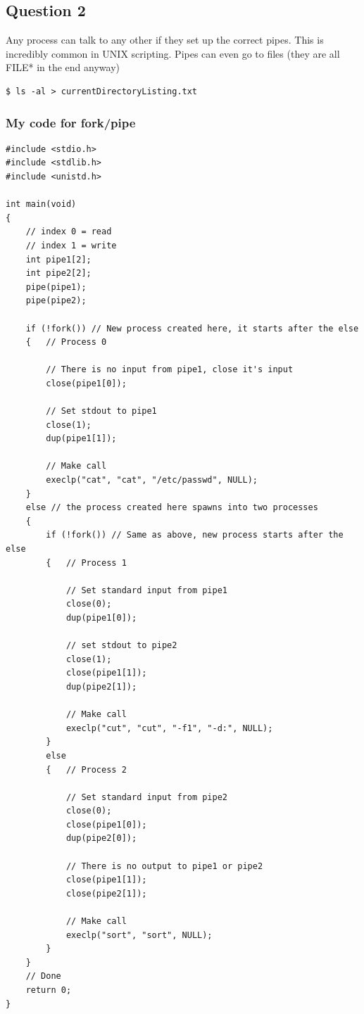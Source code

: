 \documentclass[12pt,a4paper,oneside]{article}
\begin{document}
\subsection{Question 2}
Any process can talk to any other if they set up the correct pipes.  This is incredibly common in UNIX scripting.  Pipes can even go to files (they are all FILE* in the end anyway)
\begin{verbatim}
$ ls -al > currentDirectoryListing.txt
\end{verbatim}

\subsubsection{My code for fork/pipe}
\begin{lstlisting}[basicstyle=\scriptsize, style=ElliottCListingStyle]
#include <stdio.h>
#include <stdlib.h>
#include <unistd.h>

int main(void)
{
	// index 0 = read
	// index 1 = write
	int pipe1[2];
	int pipe2[2];
	pipe(pipe1);
	pipe(pipe2);

	if (!fork()) // New process created here, it starts after the else
	{ 	// Process 0

		// There is no input from pipe1, close it's input
		close(pipe1[0]);

		// Set stdout to pipe1
		close(1);
		dup(pipe1[1]);

		// Make call
		execlp("cat", "cat", "/etc/passwd", NULL);
	}
	else // the process created here spawns into two processes
	{
		if (!fork()) // Same as above, new process starts after the else
		{	// Process 1

			// Set standard input from pipe1
			close(0);
			dup(pipe1[0]);

			// set stdout to pipe2
			close(1);
			close(pipe1[1]);
			dup(pipe2[1]);

			// Make call
			execlp("cut", "cut", "-f1", "-d:", NULL);
		}
		else
		{	// Process 2

			// Set standard input from pipe2
			close(0);
			close(pipe1[0]);
			dup(pipe2[0]);

			// There is no output to pipe1 or pipe2
			close(pipe1[1]);
			close(pipe2[1]);

			// Make call
			execlp("sort", "sort", NULL);
		}
	}
	// Done
	return 0;
}
\end{lstlisting}

\newpage
\end{document}
